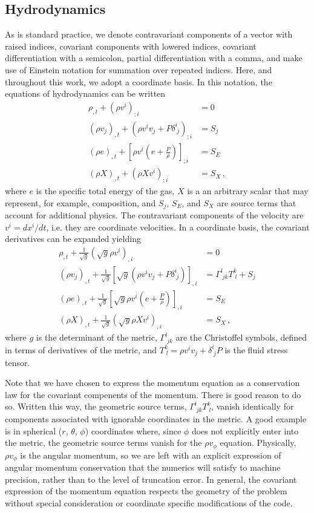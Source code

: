 \documentclass[iop]{emulateapj}
\begin{document}
\subsection{Hydrodynamics}
As is standard practice, we denote contravariant components of a vector with raised indices, covariant components with lowered indices, covariant differentiation with a semicolon, partial differentiation with a comma, and make use of Einstein notation for summation over repeated indices.  Here, and throughout this work, we adopt a coordinate basis.  In this notation, the equations of hydrodynamics can be written
\begin{align}
\rho_{,t} + (\rho v^i)_{;i}  &= 0 \label{eq:hydro_cont_start} \\ 
(\rho v_j)_{,t} + (\rho v^i v_j + P \delta^i_{\;j})_{;i} &= S_j \\
\left(\rho e\right)_{,t} + \left[\rho v^i \left(e + \frac{P}{\rho}\right)\right]_{;i} &= S_E \\
(\rho X)_{,t} + (\rho X v^i)_{;i}  &= S_X\,, \label{eq:hydro_cont_stop}
\end{align}
where $e$ is the specific total energy of the gas, $X$ is a an arbitrary scalar that may represent, for example, composition, and $S_j$, $S_E$, and $S_X$ are source terms that account for additional physics.  The contravariant components of the velocity are $v^i = dx^i/dt$, i.e. they are coordinate velocities.  In a coordinate basis, the covariant derivatives can be expanded yielding
\begin{align}
\rho_{,t} + \frac{1}{\sqrt{g}}(\sqrt{g} \rho v^i)_{,i}  &= 0 \\
(\rho v_j)_{,t} + \frac{1}{\sqrt{g}}\left[\sqrt{g} (\rho v^i v_j + P \delta^i_{\;j})\right]_{,i} &= \Gamma^l_{\;jk} T^k_{\;l} + S_j \label{eq:gas_mom}\\
\left(\rho e\right)_{,t} + \frac{1}{\sqrt{g}}\left[\sqrt{g} \rho v^i \left(e + \frac{P}{\rho}\right)\right]_{,i} &= S_E \\
(\rho X)_{,t} + \frac{1}{\sqrt{g}}(\sqrt{g} \rho X v^i)_{,i}  &= S_X\,, \label{eq:gas_comp}
\end{align}
where $g$ is the determinant of the metric, $\Gamma^l_{\;jk}$ are the Christoffel symbols, defined in terms of derivatives of the metric, and $T^k_{\;l}=\rho v^i v_j + \delta^i_{\;j} P$ is the fluid stress tensor.

Note that we have chosen to express the momentum equation as a conservation law for the covariant compenents of the momentum.  There is good reason to do so.  Written this way, the geometric source terms, $\Gamma^l_{\;jk} T^k_{\;l}$, vanish identically for components associated with ignorable coordinates in the metric.  A good example is in spherical ($r$, $\theta$, $\phi$) coordinates where, since $\phi$ does not explicitly enter into the metric, the geometric source terms vanish for the $\rho v_\phi$ equation.  Physically, $\rho v_\phi$ is the angular momentum, so we are left with an explicit expression of angular momentum conservation that the numerics will satisfy to machine precision, rather than to the level of truncation error.  In general, the covariant expression of the momentum equation respects the geometry of the problem without special consideration or coordinate specific modifications of the code.
\end{document}
